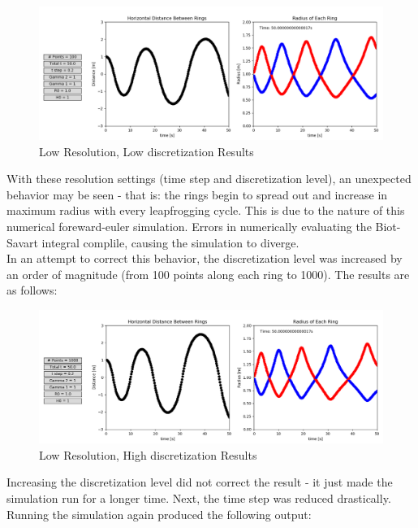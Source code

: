 \documentclass[10pt]{article}
\begin{document}
\begin{figure}[H]
   \centering
   \includegraphics[width=1\linewidth]{figures/task1_coarse_lowD.png}
   \caption{Low Resolution, Low discretization Results}
   \label{task1_coarse_lowD}
\end{figure}


With these resolution settings (time step and discretization level), an unexpected behavior may be seen - that is: the rings begin to spread out and increase in maximum radius with every leapfrogging cycle. This is due to the nature of this numerical foreward-euler simulation. Errors in numerically evaluating the Biot-Savart integral complile, causing the simulation to diverge.\\

In an attempt to correct this behavior, the discretization level was increased by an order of magnitude (from 100 points along each ring to 1000). The results are as follows:


\begin{figure}[H]
   \centering
   \includegraphics[width=1\linewidth]{figures/task1_coarse_highD.png}
   \caption{Low Resolution, High discretization Results}
   \label{task1_coarse_highD}
\end{figure}

Increasing the discretization level did not correct the result - it just made the simulation run for a longer time. Next, the time step was reduced drastically. Running the simulation again produced the following output:
\end{document}
